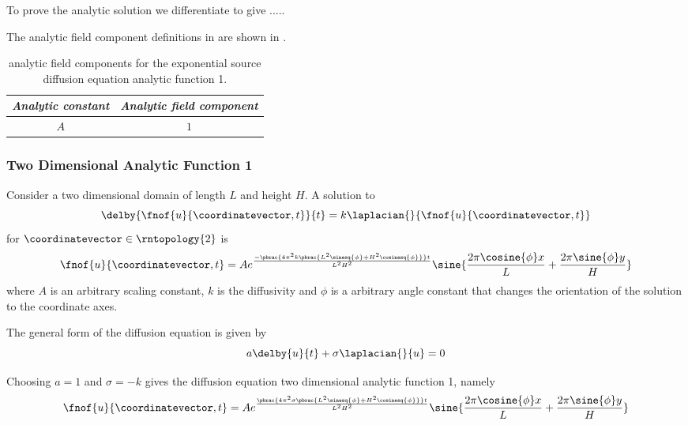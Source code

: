 To prove the analytic solution we differentiate
 to give .....

The analytic field component definitions in \OpenCMISS are shown in .

\begin{table}[htb] \centering
  \begin{tabular}{|c|c|} \hline
    \emph{Analytic constant} & \emph{Analytic field component} \\ \hline \hline
    $A$ & $1$ \\ \hline
  \end{tabular}
  \caption{\OpenCMISS analytic field components for the \oned exponential
    source diffusion equation analytic function 1.}
  \label{tab:OpenCMISSAnalyticFieldExponentialSoureDiffusionEquationOneDim1}
\end{table}


\subsubsection{Two Dimensional Analytic Function 1}

Consider a two dimensional domain of length $L$ and height $H$. A solution to
\begin{equation}
  \delby{\fnof{u}{\coordinatevector,t}}{t}=k\laplacian{}{\fnof{u}{\coordinatevector,t}}
\end{equation}
for $\coordinatevector\in\rntopology{2}$ is
\begin{equation}
  \fnof{u}{\coordinatevector,t}=Ae^{\frac{-\pbrac{4\pi^{2}k\pbrac{L^{2}\sinesq{\phi}+H^{2}\cosinesq{\phi}}}t}{L^{2}H^{2}}}
  \sine{\dfrac{2\pi\cosine{\phi}x}{L}+\dfrac{2\pi\sine{\phi}y}{H}}
\end{equation}
where $A$ is an arbitrary scaling constant, $k$ is the diffusivity and
$\phi$ is a arbitrary angle constant that changes the orientation of
the solution to the coordinate axes.

The general form of the \OpenCMISS diffusion equation is given by
\begin{equation}
  a\delby{u}{t}+\sigma\laplacian{}{u}=0
\end{equation}

Choosing $a=1$ and $\sigma=-k$ gives the
\OpenCMISS diffusion equation two dimensional analytic function 1, namely
\begin{equation}
  \fnof{u}{\coordinatevector,t}=Ae^{\frac{\pbrac{4\pi^{2}\sigma\pbrac{L^{2}\sinesq{\phi}+H^{2}\cosinesq{\phi}}}t}{L^{2}H^{2}}}
  \sine{\dfrac{2\pi\cosine{\phi}x}{L}+\dfrac{2\pi\sine{\phi}y}{H}}
  \label{eqn:OpenCMISSAnalyticDiffusionEquationTwoDim1}
\end{equation}

